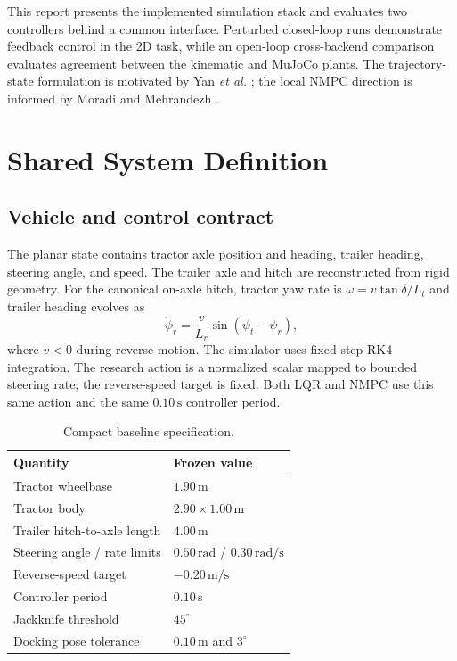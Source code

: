 \documentclass[conference]{IEEEtran}
\begin{document}
This report presents the implemented simulation stack and evaluates two
controllers behind a common interface. Perturbed closed-loop runs demonstrate
feedback control in the 2D task, while an open-loop cross-backend comparison
evaluates agreement between the kinematic and MuJoCo plants. The
trajectory-state formulation is motivated by Yan \emph{et al.}
\cite{yan2024trajectory}; the local NMPC direction is informed by Moradi and
Mehrandezh \cite{moradi2022nmpc}.

\section{Shared System Definition}

\subsection{Vehicle and control contract}

The planar state contains tractor axle position and heading, trailer heading,
steering angle, and speed. The trailer axle and hitch are reconstructed from
rigid geometry. For the canonical on-axle hitch, tractor yaw rate is
$\omega=v\tan\delta/L_t$ and trailer heading evolves as
\begin{equation}
  \dot{\psi}_r = \frac{v}{L_r}\sin(\psi_t-\psi_r),
\end{equation}
where $v<0$ during reverse motion. The simulator uses fixed-step RK4
integration. The research action is a normalized scalar mapped to bounded
steering rate; the reverse-speed target is fixed. Both LQR and NMPC use this
same action and the same $0.10\,\mathrm{s}$ controller period.

\begin{table}[t]
  \centering
  \caption{Compact baseline specification.}
  \label{tab:spec}
  \begin{tabular}{ll}
    \toprule
    Quantity & Frozen value \\
    \midrule
    Tractor wheelbase & $1.90\,\mathrm{m}$ \\
    Tractor body & $2.90\times1.00\,\mathrm{m}$ \\
    Trailer hitch-to-axle length & $4.00\,\mathrm{m}$ \\
    Steering angle / rate limits & $0.50\,\mathrm{rad}$ / $0.30\,\mathrm{rad/s}$ \\
    Reverse-speed target & $-0.20\,\mathrm{m/s}$ \\
    Controller period & $0.10\,\mathrm{s}$ \\
    Jackknife threshold & $45^\circ$ \\
    Docking pose tolerance & $0.10\,\mathrm{m}$ and $3^\circ$ \\
    \bottomrule
  \end{tabular}
\end{table}
\end{document}

